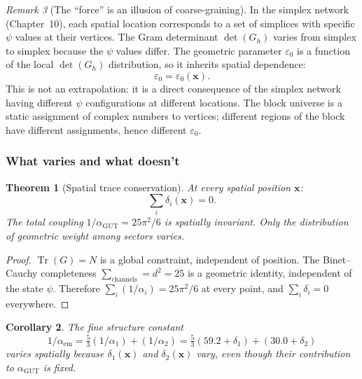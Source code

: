 \documentclass[12pt]{article}
\newtheorem{theorem}{Theorem}[section]
\newtheorem{corollary}[theorem]{Corollary}
\theoremstyle{remark}
\newtheorem{remark}[theorem]{Remark}
\theoremstyle{definition}
\newcommand{\tr}{\operatorname{Tr}}
\newcommand{\agut}{\alpha_{\mathrm{GUT}}}
\begin{document}
\begin{remark}[The ``force'' is an illusion of coarse-graining]
In the simplex network (Chapter~10), each spatial location corresponds to a set of simplices with specific $\psi$ values at their vertices. The Gram determinant $\det(G_h)$ varies from simplex to simplex because the $\psi$ values differ. The geometric parameter $\varepsilon_0$ is a function of the local $\det(G_h)$ distribution, so it inherits spatial dependence:
\begin{equation}
\varepsilon_0 = \varepsilon_0(\mathbf{x}).
\end{equation}
This is not an extrapolation: it is a direct consequence of the simplex network having different $\psi$ configurations at different locations. The block universe is a static assignment of complex numbers to vertices; different regions of the block have different assignments, hence different $\varepsilon_0$.

\subsubsection{What varies and what doesn't}

\begin{theorem}[Spatial trace conservation]
At every spatial position $\mathbf{x}$:
\begin{equation}
\sum_i \delta_i(\mathbf{x}) = 0.
\end{equation}
The total coupling $1/\agut = 25\pi^2/6$ is spatially invariant. Only the distribution of geometric weight among sectors varies.
\end{theorem}

\begin{proof}
$\tr(G) = N$ is a global constraint, independent of position. The Binet--Cauchy completeness $\sum_\text{channels} = d^2 = 25$ is a geometric identity, independent of the state $\psi$. Therefore $\sum_i(1/\alpha_i) = 25\pi^2/6$ at every point, and $\sum_i \delta_i = 0$ everywhere.
\end{proof}

\begin{corollary}
The fine structure constant
\begin{equation}
1/\alpha_\text{em} = \tfrac{5}{3}(1/\alpha_1) + (1/\alpha_2) = \tfrac{5}{3}(59.2 + \delta_1) + (30.0 + \delta_2)
\end{equation}
varies spatially because $\delta_1(\mathbf{x})$ and $\delta_2(\mathbf{x})$ vary, even though their contribution to $\agut$ is fixed.
\end{corollary}


\end{remark}
\end{document}

